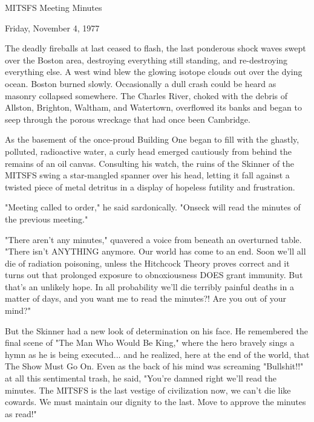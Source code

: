 \documentclass[12pt]{article}
\begin{document}
\begin{center}

MITSFS Meeting Minutes 

Friday, November 4, 1977

\end{center}
 
\vspace{12pt}

\setlength{\parskip}{6pt}

\noindent
The deadly fireballs at last ceased to flash, the last ponderous shock waves swept over the Boston area, destroying everything still standing, and re-destroying everything else. A west wind blew the glowing isotope clouds out over the dying ocean. Boston burned slowly. Occasionally a dull crash could be heard as masonry collapsed somewhere. The Charles River, choked with the debris of Allston, Brighton, Waltham, and Watertown, overflowed its banks and began to seep through the porous wreckage that had once been Cambridge.

As the basement of the once-proud Building One began to fill with the ghastly, polluted, radioactive water, a curly head emerged cautiously from behind the remains of an oil canvas. Consulting his watch, the ruins of the Skinner of the MITSFS swing a star-mangled spanner over his head, letting it fall against a twisted piece of metal detritus in a display of hopeless futility and frustration.

"Meeting called to order," he said sardonically. "Onseck will read the minutes of the previous meeting."

"There aren't any minutes," quavered a voice from beneath an overturned table. "There isn't ANYTHING anymore. Our world has come to an end. Soon we'll all die of radiation poisoning, unless the Hitchcock Theory proves correct and it turns out that prolonged exposure to obnoxiousness DOES grant immunity. But that's an unlikely hope. In all probability we'll die terribly painful deaths in a matter of days, and you want me to read the minutes?! Are you out of your mind?"

But the Skinner had a new look of determination on his face. He remembered the final scene of "The Man Who Would Be King," where the hero bravely sings a hymn as he is being executed... and he realized, here at the end of the world, that The Show Must Go On. Even as the back of his mind was screaming "Bullshit!!" at all this sentimental trash, he said, "You're damned right we'll read the minutes. The MITSFS is the last vestige of civilization now, we can't die like cowards. We must maintain our dignity to the last. Move to approve the minutes as read!"
\end{document}

